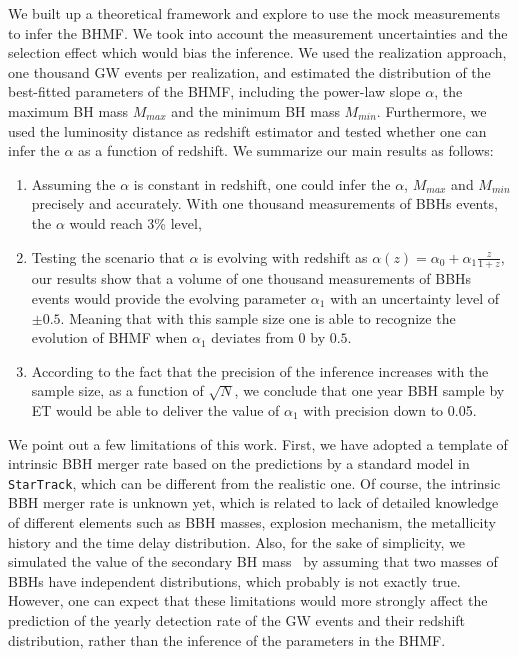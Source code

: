 \documentclass[twocolumn]{aastex62}
\begin{document}
We built up a theoretical framework and explore to use the mock measurements to infer the BHMF. We took into account the measurement uncertainties and the selection effect which would bias the inference. We used the realization approach, one thousand GW events per realization, and estimated the distribution of the best-fitted parameters of the BHMF, including the power-law slope $\alpha$, the maximum BH mass $M_{max}$ and the minimum BH mass $M_{min}$. Furthermore, we used the luminosity distance as redshift estimator and tested whether one can infer the $\alpha$ as a function of redshift. We summarize our main results as follows:
\begin{enumerate}
\item Assuming the $\alpha$ is constant in redshift, one could infer the $\alpha$, $M_{max}$ and $M_{min}$ precisely and accurately. With one thousand measurements of BBHs events, the $\alpha$ would reach 3\% level, 
\item Testing the scenario that $\alpha$ is evolving with redshift as $\alpha(z) = \alpha_0 + \alpha_1\frac{z}{1+z}$, our results show that a volume of one thousand measurements of BBHs events would provide the evolving parameter $\alpha_1$ with an uncertainty level of $\pm0.5$. Meaning that with this sample size one is able to recognize the evolution of BHMF when $\alpha_1$ deviates from $0$ by $0.5$.
\item According to the fact that the precision of the inference increases with the sample size, as a function of $\sqrt{N}$, we conclude that one year BBH sample by ET would be able to deliver the value of $\alpha_1$ with precision down to 0.05.
\end{enumerate}

We point out a few limitations of this work. First, we have adopted a template of intrinsic BBH merger rate based on the predictions by a standard model in {\tt StarTrack}, which can be different from the realistic one. Of course, the intrinsic BBH merger rate is unknown yet, which is related to 
lack of detailed knowledge of different elements such as BBH masses, explosion mechanism, the metallicity history and the time delay distribution. Also, for the sake of simplicity, we simulated the value of the secondary BH mass \mtwo\ by assuming that two masses of BBHs have independent distributions, which probably is not exactly true. However, one can expect that these limitations would more strongly affect the prediction of the yearly detection rate of the GW events and their redshift distribution, rather than the inference of the parameters in the BHMF.
\end{document}
